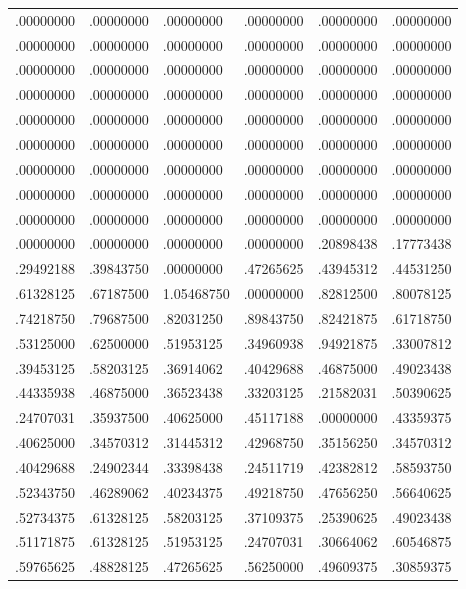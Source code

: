 \documentclass[11pt]{article}
\theoremstyle{definition}
\theoremstyle{remark}
\begin{document}
\begin{longtable}{llllll}
.00000000 & .00000000 & .00000000 & .00000000 & .00000000 & .00000000 \\
.00000000 & .00000000 & .00000000 & .00000000 & .00000000 & .00000000 \\
.00000000 & .00000000 & .00000000 & .00000000 & .00000000 & .00000000 \\
.00000000 & .00000000 & .00000000 & .00000000 & .00000000 & .00000000 \\
.00000000 & .00000000 & .00000000 & .00000000 & .00000000 & .00000000 \\
.00000000 & .00000000 & .00000000 & .00000000 & .00000000 & .00000000 \\
.00000000 & .00000000 & .00000000 & .00000000 & .00000000 & .00000000 \\
.00000000 & .00000000 & .00000000 & .00000000 & .00000000 & .00000000 \\
.00000000 & .00000000 & .00000000 & .00000000 & .00000000 & .00000000 \\
.00000000 & .00000000 & .00000000 & .00000000 & .20898438 & .17773438 \\
.29492188 & .39843750 & .00000000 & .47265625 & .43945312 & .44531250 \\
.61328125 & .67187500 & 1.05468750 & .00000000 & .82812500 & .80078125 \\
.74218750 & .79687500 & .82031250 & .89843750 & .82421875 & .61718750 \\
.53125000 & .62500000 & .51953125 & .34960938 & .94921875 & .33007812 \\
.39453125 & .58203125 & .36914062 & .40429688 & .46875000 & .49023438 \\
.44335938 & .46875000 & .36523438 & .33203125 & .21582031 & .50390625 \\
.24707031 & .35937500 & .40625000 & .45117188 & .00000000 & .43359375 \\
.40625000 & .34570312 & .31445312 & .42968750 & .35156250 & .34570312 \\
.40429688 & .24902344 & .33398438 & .24511719 & .42382812 & .58593750 \\
.52343750 & .46289062 & .40234375 & .49218750 & .47656250 & .56640625 \\
.52734375 & .61328125 & .58203125 & .37109375 & .25390625 & .49023438 \\
.51171875 & .61328125 & .51953125 & .24707031 & .30664062 & .60546875 \\
.59765625 & .48828125 & .47265625 & .56250000 & .49609375 & .30859375 \\

\end{longtable}
\end{document}
